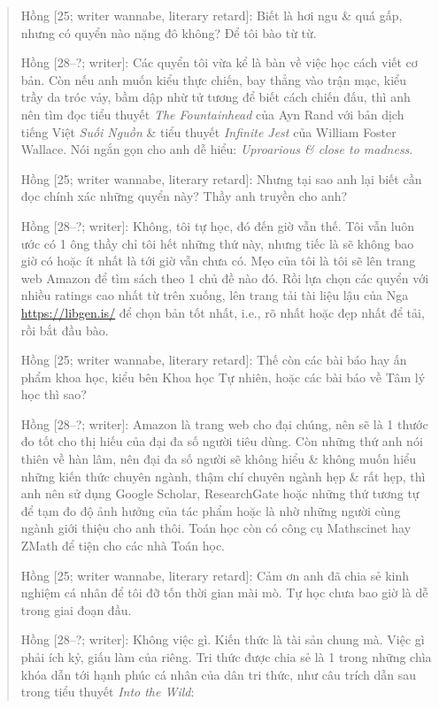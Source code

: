 \documentclass[12pt]{article}
\begin{document}
\begin{quote}
	{\sf Hồng [25; writer wannabe, literary retard]}: Biết là hơi ngu \& quá gấp, nhưng có quyển nào nặng đô không? Để tôi bào từ từ.
	
	{\sf Hồng [28--?; writer]}: Các quyển tôi vừa kể là bàn về việc học cách viết cơ bản. Còn nếu anh muốn kiểu thực chiến, bay thẳng vào trận mạc, kiểu trầy da tróc vảy, bầm dập nhừ tử tương để biết cách chiến đấu, thì anh nên tìm đọc tiểu thuyết {\it The Fountainhead} \cite{Rand_fountainhead} của {\sc Ayn Rand} với bản dịch tiếng Việt {\it Suối Nguồn} \cite{Rand_fountainhead_VN} \& tiểu thuyết {\it Infinite Jest} \cite{Wallace_jest} của {\sc William Foster Wallace}. Nói ngắn gọn cho anh dễ hiểu: {\it Uproarious \& close to madness}.
	
	{\sf Hồng [25; writer wannabe, literary retard]}: Nhưng tại sao anh lại biết cần đọc chính xác những quyển này? Thầy anh truyền cho anh?
	
	{\sf Hồng [28--?; writer]}: Không, tôi tự học, đó đến giờ vẫn thế. Tôi vẫn luôn ước có 1 ông thầy chỉ tôi hết những thứ này, nhưng tiếc là sẽ không bao giờ có hoặc ít nhất là tới giờ vẫn chưa có. Mẹo của tôi là tôi sẽ lên trang web Amazon để tìm sách theo 1 chủ đề nào đó. Rồi lựa chọn các quyển với nhiều ratings cao nhất từ trên xuống, lên trang tải tài liệu lậu của Nga \url{https://libgen.is/} để chọn bản tốt nhất, i.e., rõ nhất hoặc đẹp nhất để tải, rồi bắt đầu bào.
	
	{\sf Hồng [25; writer wannabe, literary retard]}: Thế còn các bài báo hay ấn phẩm khoa học, kiểu bên Khoa học Tự nhiên, hoặc các bài báo về Tâm lý học thì sao?
	
	{\sf Hồng [28--?; writer]}: Amazon là trang web cho đại chúng, nên sẽ là 1 thước đo tốt cho thị hiếu của đại đa số người tiêu dùng. Còn những thứ anh nói thiên về hàn lâm, nên đại đa số người sẽ không hiểu \& không muốn hiểu những kiến thức chuyên ngành, thậm chí chuyên ngành hẹp \& rất hẹp, thì anh nên sử dụng Google Scholar, ResearchGate hoặc những thứ tương tự để tạm đo độ ảnh hưởng của tác phẩm hoặc là nhờ những người cùng ngành giới thiệu cho anh thôi. Toán học còn có công cụ Mathscinet hay ZMath để tiện cho các nhà Toán học.
	
	{\sf Hồng [25; writer wannabe, literary retard]}: Cảm ơn anh đã chia sẻ kinh nghiệm cá nhân để tôi đỡ tốn thời gian mài mò. Tự học chưa bao giờ là dễ trong giai đoạn đầu.
	
	{\sf Hồng [28--?; writer]}: Không việc gì. Kiến thức là tài sản chung mà. Việc gì phải ích kỷ, giấu làm của riêng. Tri thức được chia sẻ là 1 trong những chìa khóa dẫn tới hạnh phúc cá nhân của dân tri thức, như câu trích dẫn sau trong tiểu thuyết {\it Into the Wild}:
\end{quote}
\end{document}
